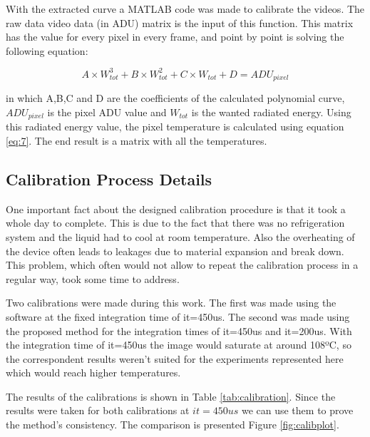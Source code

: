 \par With the extracted curve a MATLAB code was made to calibrate the videos. The raw data video data (in ADU) matrix is the input of this function. This matrix has the value for every pixel in every frame, and point by point is solving the following equation:

\begin{equation}
A \times W_{tot}^3 + B \times W_{tot}^2 + C \times W_{tot} + D = ADU_{pixel}
\end{equation}

in which A,B,C and D are the coefficients of the calculated polynomial curve, $ADU_{pixel}$ is the pixel ADU value and $W_{tot}$ is the wanted radiated energy. Using this radiated energy value, the pixel temperature is calculated using equation \ref{eq:7}. The end result is a matrix with all the temperatures.

\subsection{Calibration Process Details}

\par One important fact about the designed calibration procedure is that it took a whole day to complete. This is due to the fact that there was no refrigeration system and the liquid had to cool at room temperature. Also the overheating of the device often leads to leakages due to material expansion and break down. This problem, which often would not allow to repeat the calibration process in a regular way, took some time to address.\\

\par Two calibrations were made during this work. The first was made using the software at the fixed integration time of it=450us. The second was made using the proposed method for the integration times of it=450us and it=200us. With the integration time of it=450us the image would saturate at around 108ºC, so the correspondent results weren't suited for the experiments represented here which would reach higher temperatures. \\

\par The results of the calibrations is shown in Table \ref{tab:calibration}. Since the results were taken for both calibrations at $it=450us$ we can use them to prove the method's consistency. The comparison is presented Figure \ref{fig:calibplot}.  \\

